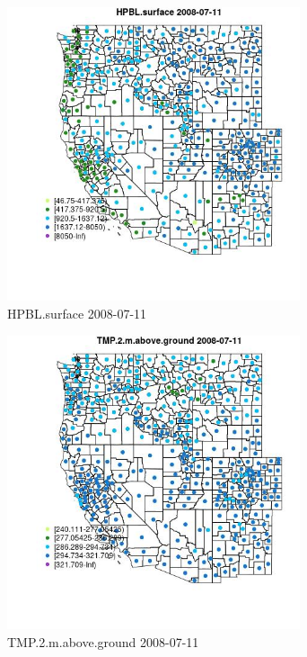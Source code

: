 \begin{figure} 
\centering  
\includegraphics[width=0.77\textwidth]{Code_Outputs/df_report_ML_predictors_CountyCentroid_Locations_Dates_2008-01-01to2018-12-31_MapObsHPBLsurface2008-07-11.jpg} 
\caption{\label{fig:df_report_ML_predictors_CountyCentroid_Locations_Dates_2008-01-01to2018-12-31MapObsHPBLsurface2008-07-11}HPBL.surface 2008-07-11} 
\end{figure} 
 

\begin{figure} 
\centering  
\includegraphics[width=0.77\textwidth]{Code_Outputs/df_report_ML_predictors_CountyCentroid_Locations_Dates_2008-01-01to2018-12-31_MapObsTMP2maboveground2008-07-11.jpg} 
\caption{\label{fig:df_report_ML_predictors_CountyCentroid_Locations_Dates_2008-01-01to2018-12-31MapObsTMP2maboveground2008-07-11}TMP.2.m.above.ground 2008-07-11} 
\end{figure} 
 

